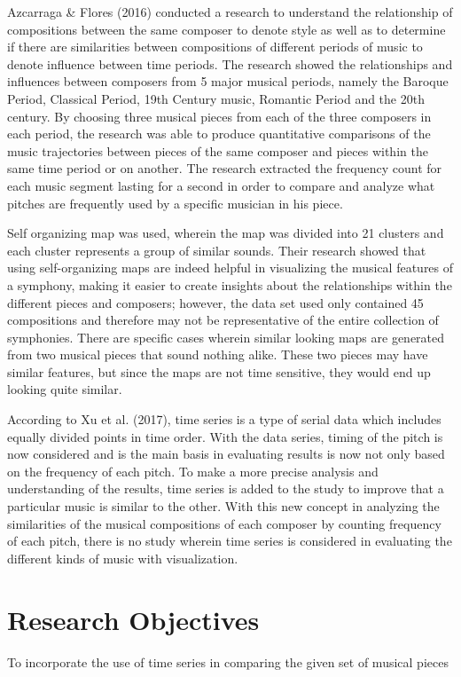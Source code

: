 Azcarraga \& Flores (2016) conducted a research to understand the relationship of compositions between the same composer to denote style as well as to determine if there are similarities between compositions of different periods of music to denote influence between time periods. The research showed the relationships and influences between composers from 5 major musical periods, namely the Baroque Period, Classical Period, 19th Century music, Romantic Period and the 20th century. By choosing three musical pieces from each of the three composers in each period, the research was able to produce quantitative comparisons of the music trajectories between pieces of the same composer and pieces within the same time period or on another. The research extracted the frequency count for each music segment lasting for a second in order to compare and analyze what pitches are frequently used by a specific musician in his piece.

Self organizing map was used, wherein the map was divided into 21 clusters and each cluster represents a group of similar sounds. Their research showed that using self-organizing maps are indeed helpful in visualizing the musical features of a symphony, making it easier to create insights about the relationships within the different pieces and composers; however, the data set used only contained 45 compositions and therefore may not be representative of the entire collection of symphonies. There are specific cases wherein similar looking maps are generated from two musical pieces that sound nothing alike. These two pieces may have similar features, but since the maps are not time sensitive, they would end up looking quite similar.

According to Xu et al. (2017), time series is a type of serial data which includes equally divided points in time order. With the data series, timing of the pitch is now considered and is the main basis in evaluating results is now not only based on the frequency of each pitch. To make a more precise analysis and understanding of the results, time series is added to the study to improve that a particular music is similar to the other. With this new concept in analyzing the similarities of the musical compositions of each composer by counting frequency of each pitch, there is no study wherein time series is considered in evaluating the different kinds of music with visualization. 
\section{Research Objectives}
\label{sec:researchobjectives}
To incorporate the use of time series in comparing the given set of musical pieces

